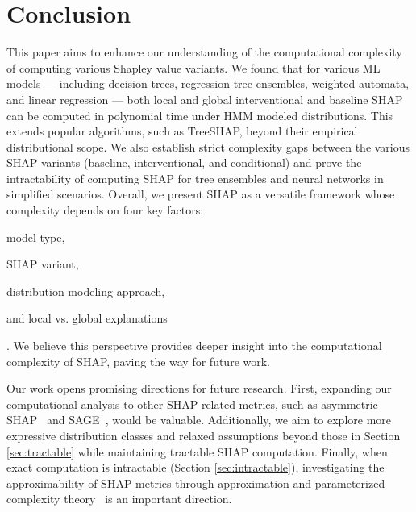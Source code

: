 \section*{Conclusion}
This paper aims to enhance our understanding of the computational complexity of computing various Shapley value variants. We found that for various ML models --- including decision trees, regression tree ensembles, weighted automata, and linear regression --- both local and global interventional and baseline SHAP can be computed in polynomial time under HMM modeled distributions. This extends popular algorithms, such as TreeSHAP, beyond their empirical distributional scope. We also establish strict complexity gaps between the various SHAP variants (baseline, interventional, and conditional) and prove the intractability of computing SHAP for tree ensembles and neural networks in simplified scenarios. Overall, we present SHAP as a versatile framework whose complexity depends on four key factors: \begin{inparaenum}[(i)] \item model type, \item SHAP variant, \item distribution modeling approach, \item and local vs. global explanations\end{inparaenum}. We believe this perspective provides deeper insight into the computational complexity of SHAP, paving the way for future work.





Our work opens promising directions for future research. First, expanding our computational analysis to other SHAP-related metrics, such as asymmetric SHAP~\citep{frye20} and SAGE~\citep{covert2020understanding}, would be valuable. Additionally, we aim to explore more expressive distribution classes and relaxed assumptions beyond those in Section \ref{sec:tractable} while maintaining tractable SHAP computation. Finally, when exact computation is intractable (Section \ref{sec:intractable}), investigating the approximability of SHAP metrics through approximation and parameterized complexity theory~\citep{downey2012parameterized} is an important direction.

